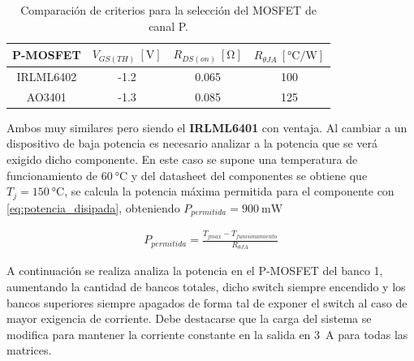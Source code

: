 \begin{table}[H]
\centering
\begin{tabular}{@{}cccc@{}}
\toprule
P-MOSFET  & $V_{GS(TH)}\ [\si{\volt}]$ & $R_{DS(on)}\ [\si{\ohm}]$ & $R_{\theta JA}\ [\si{\celsius \per \watt}] $ \\ \midrule
IRLML6402 & -1.2         & 0.065        & 100             \\
AO3401    & -1.3         & 0.085        & 125             \\ \bottomrule
\end{tabular}
\caption{Comparación de criterios para la selección del MOSFET de canal P.}
\label{tab:nuevo_pmos}
\end{table}


 Ambos muy similares pero siendo el \textbf{IRLML6401} con ventaja. Al cambiar a un dispositivo de baja potencia es necesario analizar a la potencia que se verá exigido dicho componente. En este caso se supone una temperatura de funcionamiento  de $\SI{60}{\celsius}$ y del datasheet del componentes se obtiene que $T_{j} = \SI{150}{\celsius}$, se calcula la potencia máxima permitida para el componente con \eqref{eq:potencia_disipada}, obteniendo $P_{permitida} = \SI{900}{\milli \watt}$


\begin{gather}
    P_{permitida} = \frac{T_{jmax} - T_{funcionamiento}}{R_{\theta JA}}
    \label{eq:potencia_disipada}
\end{gather}


A continuación se realiza analiza la potencia en el P-MOSFET del banco 1, aumentando la cantidad de bancos totales, dicho switch siempre encendido y los bancos superiores siempre apagados de forma tal de exponer el switch al caso de mayor exigencia de corriente. Debe destacarse que la carga del sistema se modifica para mantener la corriente constante en la salida en \SI{3}{\ampere} para todas las matrices.



